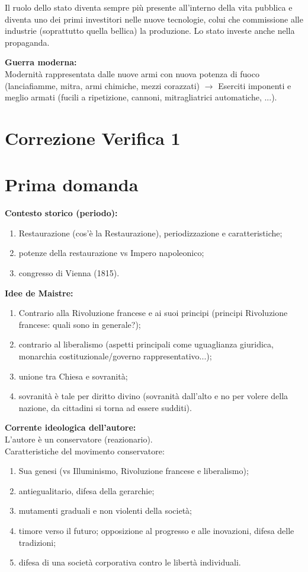 \documentclass[a4paper]{article}
\begin{document}
Il ruolo dello stato diventa sempre più presente
all'interno della vita pubblica e diventa uno dei primi investitori
nelle nuove tecnologie, colui che commissione alle industrie (soprattutto quella bellica)
la produzione.
Lo stato investe anche nella propaganda.

\textbf{Guerra moderna:} \\
Modernità rappresentata dalle nuove armi con nuova potenza di fuoco
(lanciafiamme, mitra, armi chimiche, mezzi corazzati)
\(\rightarrow\) Eserciti imponenti e meglio armati (fucili a ripetizione, cannoni, mitragliatrici automatiche, ...).

\pagebreak

\section{Correzione Verifica 1}

\section{Prima domanda}

\textbf{Contesto storico (periodo):}
\begin{enumerate}
    \item Restaurazione (cos'è la Restaurazione), periodizzazione e caratteristiche;
    \item potenze della restaurazione vs Impero napoleonico;
    \item congresso di Vienna (1815).
\end{enumerate}

\textbf{Idee de Maistre:}
\begin{enumerate}
    \item Contrario alla Rivoluzione francese e ai suoi principi (principi Rivoluzione francese: quali sono in generale?);
    \item contrario al liberalismo (aspetti principali come uguaglianza giuridica, monarchia costituzionale/governo rappresentativo...);
    \item unione tra Chiesa e sovranità;
    \item sovranità è tale per diritto divino (sovranità dall'alto e no per volere della nazione, da cittadini si torna ad essere sudditi).
\end{enumerate}

\textbf{Corrente ideologica dell'autore:} \\
L'autore è un conservatore (reazionario). \\
Caratteristiche del movimento conservatore:
\begin{enumerate}
    \item Sua genesi (vs Illuminismo, Rivoluzione francese e liberalismo);
    \item antiegualitario, difesa della gerarchie;
    \item mutamenti graduali e non violenti della società;
    \item timore verso il futuro; opposizione al progresso e alle inovazioni, difesa delle tradizioni;
    \item difesa di una società corporativa contro le libertà individuali.
\end{enumerate}
\end{document}
